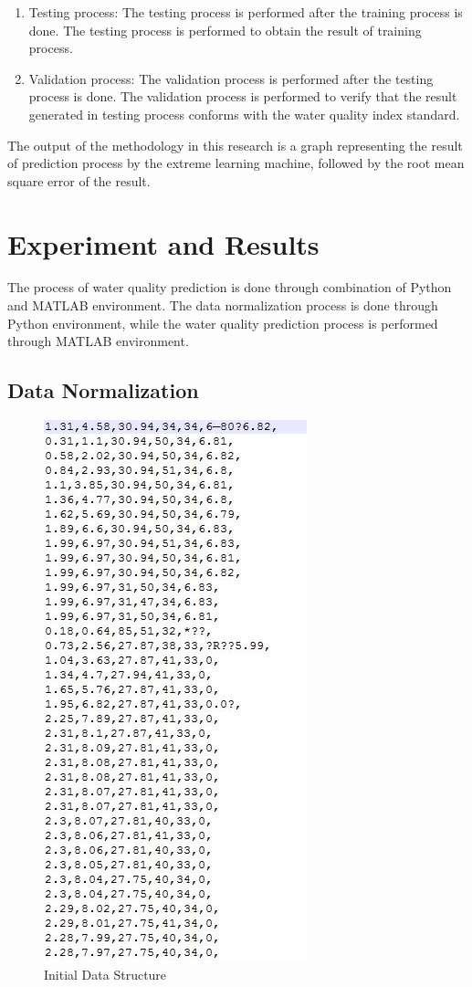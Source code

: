 \documentclass{ws-ijait}
\begin{document}
\begin{enumerate}
\item Testing process: The testing process is performed after the training process is done. The testing process is performed to obtain the result of training process.

\item Validation process: The validation process is performed after the testing process is done. The validation process is performed to verify that the result generated in testing process conforms with the water quality index standard.

\end{enumerate}

The output of the methodology in this research is a graph representing the result of prediction process by the extreme learning machine, followed by the root mean square error of the result.

\section{Experiment and Results}

The process of water quality prediction is done through combination of Python and MATLAB environment. The data normalization process is done through Python environment, while the water quality prediction process is performed through MATLAB environment.

\subsection{Data Normalization}

\begin{figure}
\centerline{\includegraphics[scale=0.3]{fig-3.jpg}}
\caption{Initial Data Structure\cite{16}}\label{Fig. 3}
\end{figure}
\end{document}
